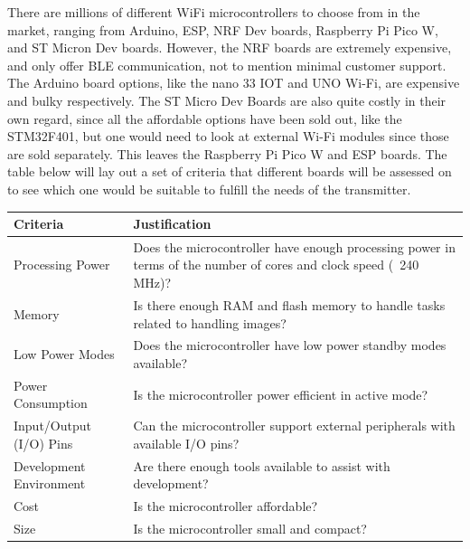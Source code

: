 There are millions of different WiFi microcontrollers to choose from in the market, ranging from Arduino, ESP, NRF Dev boards, Raspberry Pi Pico W, and ST Micron Dev boards. However, the NRF boards are extremely expensive, and only offer BLE communication, not to mention minimal customer support. The Arduino board options, like the nano 33 IOT and UNO Wi-Fi, are expensive and bulky respectively. The ST Micro Dev Boards are also quite costly in their own regard, since all the affordable options have been sold out, like the STM32F401, but one would need to look at external Wi-Fi modules since those are sold separately. This leaves the Raspberry Pi Pico W and ESP boards. The table below will lay out a set of criteria that different boards will be assessed on to see which one would be suitable to fulfill the needs of the transmitter.

\begin{table}[h]
\centering
\begin{tabular}{|l|p{10cm}|}
\hline
\textbf{Criteria} & \textbf{Justification} \\
\hline
Processing Power & Does the microcontroller have enough processing power in terms of the number of cores and clock speed (~240 MHz)? \\
\hline
Memory & Is there enough RAM and flash memory to handle tasks related to handling images? \\
\hline
Low Power Modes & Does the microcontroller have low power standby modes available? \\
\hline
Power Consumption & Is the microcontroller power efficient in active mode? \\
\hline
Input/Output (I/O) Pins & Can the microcontroller support external peripherals with available I/O pins? \\
\hline
Development Environment & Are there enough tools available to assist with development? \\
\hline
Cost & Is the microcontroller affordable? \\
\hline
Size & Is the microcontroller small and compact? \\
\hline
\end{tabular}
\label{tab:microcontroller_criteria}
\end{table}


